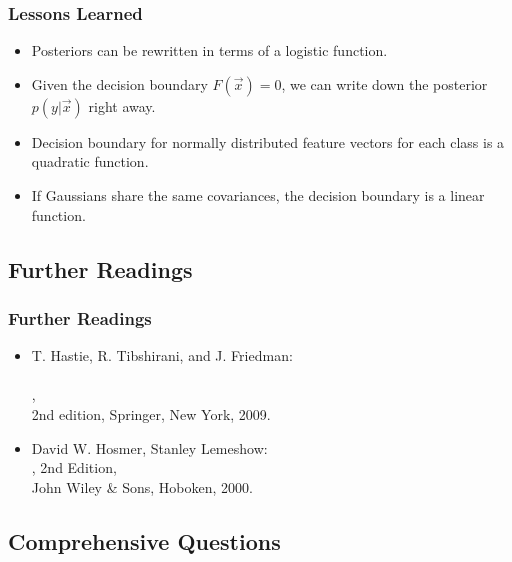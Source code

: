 \begin{frame}
  \frametitle{Lessons Learned}

  \begin{itemize}
    \item Posteriors can be rewritten in terms of a logistic function. \pause
    \item Given the decision boundary $F(\vec x)=0$, we can write down the posterior $p(y|\vec x)$ right away. \pause
    \item Decision boundary for normally distributed feature vectors for each class is a quadratic function. \pause
    \item If Gaussians share the same covariances, the decision boundary is a linear function.
  \end{itemize}
\end{frame}



\subsection{Further Readings}

\begin{frame}
  \frametitle{Further Readings}
  
  \begin{itemize}
    \item T. Hastie, R. Tibshirani, and J. Friedman: \\
      \\
      ,\\
      2nd edition, Springer, New York, 2009. \\[.3cm]
    \item David W. Hosmer, Stanley Lemeshow: \\
      , 2nd Edition, \\
      John Wiley \& Sons, Hoboken, 2000.
  \end{itemize}
\end{frame}


\subsection{Comprehensive Questions}

